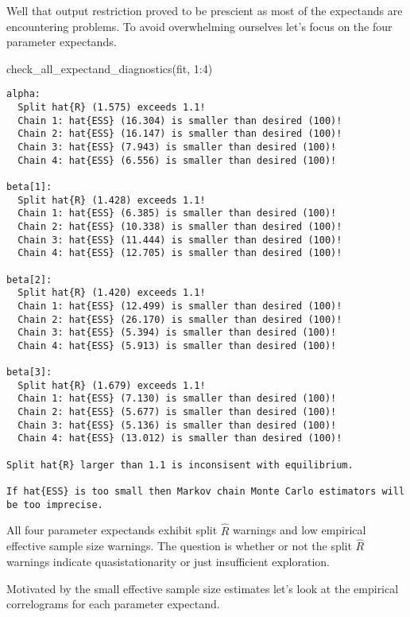 \documentclass[
  letterpaper,
  DIV=11,
  numbers=noendperiod]{scrartcl}
\newenvironment{Shaded}{\begin{snugshade}}{\end{snugshade}}
\newcommand{\DecValTok}[1]{\textcolor[rgb]{0.68,0.00,0.00}{#1}}
\newcommand{\FunctionTok}[1]{\textcolor[rgb]{0.28,0.35,0.67}{#1}}
\newcommand{\NormalTok}[1]{\textcolor[rgb]{0.00,0.23,0.31}{#1}}
\newcommand{\SpecialCharTok}[1]{\textcolor[rgb]{0.37,0.37,0.37}{#1}}
\begin{document}
Well that output restriction proved to be prescient as most of the
expectands are encountering problems. To avoid overwhelming ourselves
let's focus on the four parameter expectands.

\begin{Shaded}
\begin{Highlighting}[]
\FunctionTok{check\_all\_expectand\_diagnostics}\NormalTok{(fit, }\DecValTok{1}\SpecialCharTok{:}\DecValTok{4}\NormalTok{)}
\end{Highlighting}
\end{Shaded}

\begin{verbatim}
alpha:
  Split hat{R} (1.575) exceeds 1.1!
  Chain 1: hat{ESS} (16.304) is smaller than desired (100)!
  Chain 2: hat{ESS} (16.147) is smaller than desired (100)!
  Chain 3: hat{ESS} (7.943) is smaller than desired (100)!
  Chain 4: hat{ESS} (6.556) is smaller than desired (100)!

beta[1]:
  Split hat{R} (1.428) exceeds 1.1!
  Chain 1: hat{ESS} (6.385) is smaller than desired (100)!
  Chain 2: hat{ESS} (10.338) is smaller than desired (100)!
  Chain 3: hat{ESS} (11.444) is smaller than desired (100)!
  Chain 4: hat{ESS} (12.705) is smaller than desired (100)!

beta[2]:
  Split hat{R} (1.420) exceeds 1.1!
  Chain 1: hat{ESS} (12.499) is smaller than desired (100)!
  Chain 2: hat{ESS} (26.170) is smaller than desired (100)!
  Chain 3: hat{ESS} (5.394) is smaller than desired (100)!
  Chain 4: hat{ESS} (5.913) is smaller than desired (100)!

beta[3]:
  Split hat{R} (1.679) exceeds 1.1!
  Chain 1: hat{ESS} (7.130) is smaller than desired (100)!
  Chain 2: hat{ESS} (5.677) is smaller than desired (100)!
  Chain 3: hat{ESS} (5.136) is smaller than desired (100)!
  Chain 4: hat{ESS} (13.012) is smaller than desired (100)!

Split hat{R} larger than 1.1 is inconsisent with equilibrium.

If hat{ESS} is too small then Markov chain Monte Carlo estimators will be too imprecise.
\end{verbatim}

All four parameter expectands exhibit split \(\hat{R}\) warnings and low
empirical effective sample size warnings. The question is whether or not
the split \(\hat{R}\) warnings indicate quasistationarity or just
insufficient exploration.

Motivated by the small effective sample size estimates let's look at the
empirical correlograms for each parameter expectand.
\end{document}
